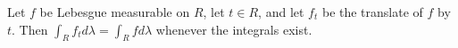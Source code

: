 Let $f$ be Lebesgue measurable on $R$, let $t \in R$, and let $f_t$ be the translate of $f$ by $t$. Then $\int_R f_t d\lambda = \int_R f d\lambda$ whenever the integrals exist.

